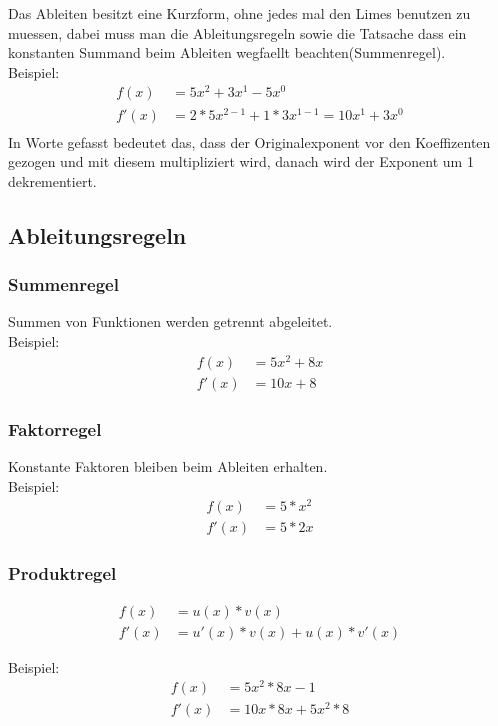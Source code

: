 \documentclass[a4paper]{article} %
\begin{document}
	Das Ableiten besitzt eine Kurzform, ohne jedes mal den Limes benutzen zu muessen, dabei muss man die Ableitungsregeln sowie die Tatsache dass ein konstanten Summand beim Ableiten wegfaellt beachten(Summenregel).
\\	Beispiel:\\
		\begin{align*}
	f(x)  &= 5x^2+3x^1-5x^0\\
	f'(x)  &= 2*5x^{2-1}+1*3x^{1-1} = 10x^1+3x^0\\
	\end{align*}
	In Worte gefasst bedeutet das, dass der Originalexponent vor den Koeffizenten gezogen und mit diesem multipliziert wird, danach wird der Exponent um 1 dekrementiert.

	\subsection{Ableitungsregeln}
	\subsubsection{Summenregel}
	Summen von Funktionen werden getrennt abgeleitet. \\
	Beispiel: \\
		\begin{align*}
			f(x) &= 5x^2+8x  \\
			 f'(x)&= 10x+8
		\end{align*}
	\subsubsection{Faktorregel}
	Konstante Faktoren bleiben beim Ableiten erhalten. \\
	Beispiel: \\ \begin{align*}
					f(x)&= 5*x^2 \\
					f'(x) &= 5*2x
				\end{align*}

	\subsubsection{Produktregel}
	\begin{align*}
		f(x)&=u(x)*v(x)\\
		f'(x)&=u'(x)*v(x)+u(x)*v'(x)
	\end{align*}

	Beispiel: \\
	\begin{align*}
		f(x) &= 5x^2*8x-1  \\
		f'(x)&= 10x*8x+5x^2*8
	\end{align*}
\end{document}
